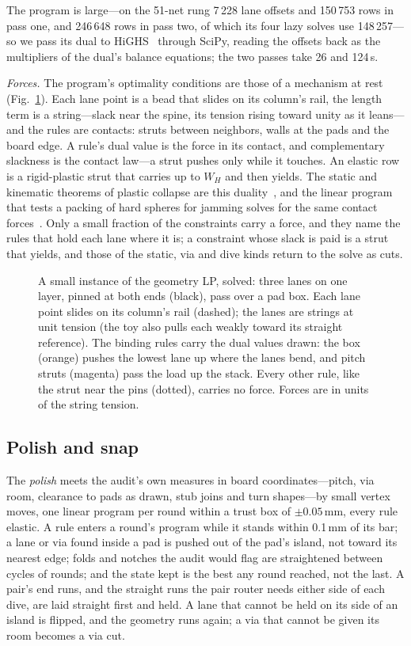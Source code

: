 \documentclass[journal]{IEEEtran}
\begin{document}
The program is large---on the 51-net rung 7\,228 lane offsets and 150\,753 rows in pass one, and 246\,648 rows in pass two, of which its four lazy solves use 148\,257---so we pass its dual to HiGHS~\cite{huangfu2018} through SciPy, reading the offsets back as the multipliers of the dual's balance equations; the two passes take 26 and 124\,s.

\emph{Forces.} The program's optimality conditions are those of a mechanism at rest (Fig.~\ref{fig:lp}). Each lane point is a bead that slides on its column's rail, the length term is a string---slack near the spine, its tension rising toward unity as it leans---and the rules are contacts: struts between neighbors, walls at the pads and the board edge. A rule's dual value is the force in its contact, and complementary slackness is the contact law---a strut pushes only while it touches. An elastic row is a rigid-plastic strut that carries up to $W_H$ and then yields. The static and kinematic theorems of plastic collapse are this duality~\cite{charnes1959}, and the linear program that tests a packing of hard spheres for jamming solves for the same contact forces~\cite{donev2004}. Only a small fraction of the constraints carry a force, and they name the rules that hold each lane where it is; a constraint whose slack is paid is a strut that yields, and those of the static, via and dive kinds return to the solve as cuts.

\begin{figure}[t]
\centering

\caption{A small instance of the geometry LP, solved: three lanes on one layer, pinned at both ends (black), pass over a pad box. Each lane point slides on its column's rail (dashed); the lanes are strings at unit tension (the toy also pulls each weakly toward its straight reference). The binding rules carry the dual values drawn: the box (orange) pushes the lowest lane up where the lanes bend, and pitch struts (magenta) pass the load up the stack. Every other rule, like the strut near the pins (dotted), carries no force. Forces are in units of the string tension.}
\label{fig:lp}
\end{figure}

\subsection{Polish and snap}
\label{sec:polish}
The \emph{polish} meets the audit's own measures in board coordinates---pitch, via room, clearance to pads as drawn, stub joins and turn shapes---by small vertex moves, one linear program per round within a trust box of $\pm0.05$\,mm, every rule elastic. A rule enters a round's program while it stands within 0.1\,mm of its bar; a lane or via found inside a pad is pushed out of the pad's island, not toward its nearest edge; folds and notches the audit would flag are straightened between cycles of rounds; and the state kept is the best any round reached, not the last. A pair's end runs, and the straight runs the pair router needs either side of each dive, are laid straight first and held. A lane that cannot be held on its side of an island is flipped, and the geometry runs again; a via that cannot be given its room becomes a via cut.
\end{document}
